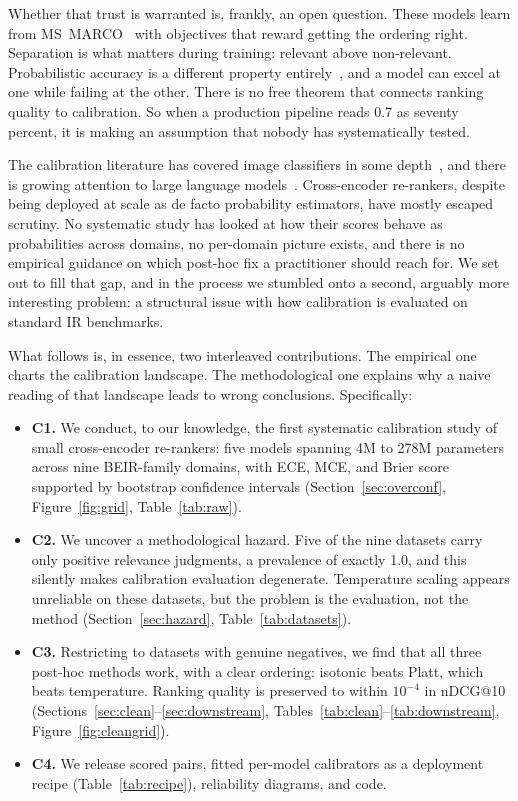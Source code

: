 Whether that trust is warranted is, frankly, an open question. These models learn
from MS~MARCO~\cite{nguyen2016msmarco} with objectives that reward getting the
ordering right. Separation is what matters during training: relevant above
non-relevant. Probabilistic accuracy is a different property
entirely~\cite{degroot1983}, and a model can excel at one while failing at the other.
There is no free theorem that connects ranking quality to calibration. So when a
production pipeline reads 0.7 as seventy percent, it is making an assumption that
nobody has systematically tested.

The calibration literature has covered image classifiers in some
depth~\cite{guo2017}, and there is growing attention to large language
models~\cite{kadavath2022,jiang2021}. Cross-encoder re-rankers, despite being
deployed at scale as de facto probability estimators, have mostly escaped scrutiny.
No systematic study has looked at how their scores behave as probabilities across
domains, no per-domain picture exists, and there is no empirical guidance on which
post-hoc fix a practitioner should reach for. We set out to fill that gap, and in the
process we stumbled onto a second, arguably more interesting problem: a structural
issue with how calibration is evaluated on standard IR benchmarks.

What follows is, in essence, two interleaved contributions. The empirical one charts
the calibration landscape. The methodological one explains why a naive reading of
that landscape leads to wrong conclusions. Specifically:

\begin{itemize}[leftmargin=*,itemsep=2pt]
  \item \textbf{C1.} We conduct, to our knowledge, the first systematic calibration
  study of small cross-encoder re-rankers: five models spanning 4M to 278M
  parameters across nine BEIR-family domains, with ECE, MCE, and Brier score
  supported by bootstrap confidence intervals (Section~\ref{sec:overconf},
  Figure~\ref{fig:grid}, Table~\ref{tab:raw}).

  \item \textbf{C2.} We uncover a methodological hazard. Five of the nine datasets
  carry only positive relevance judgments, a prevalence of exactly 1.0, and this
  silently makes calibration evaluation degenerate. Temperature scaling appears
  unreliable on these datasets, but the problem is the evaluation, not the method
  (Section~\ref{sec:hazard}, Table~\ref{tab:datasets}).

  \item \textbf{C3.} Restricting to datasets with genuine negatives, we find that all
  three post-hoc methods work, with a clear ordering: isotonic beats Platt, which
  beats temperature. Ranking quality is preserved to within $10^{-4}$ in nDCG@10
  (Sections~\ref{sec:clean}--\ref{sec:downstream}, Tables~\ref{tab:clean}--\ref{tab:downstream}, Figure~\ref{fig:cleangrid}).

  \item \textbf{C4.} We release scored pairs, fitted per-model calibrators as a
  deployment recipe (Table~\ref{tab:recipe}), reliability diagrams, and code.
\end{itemize}


